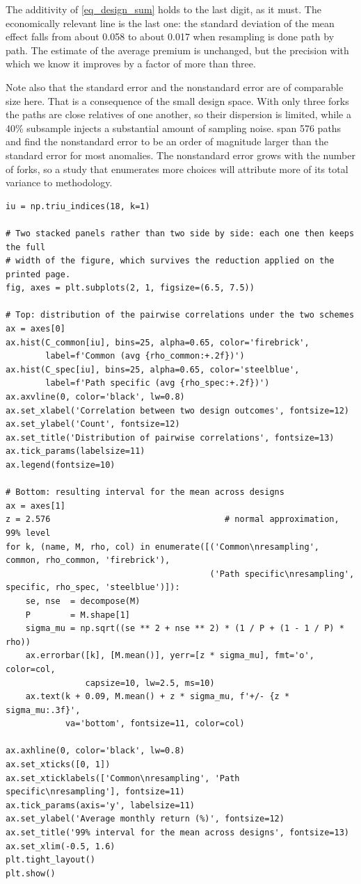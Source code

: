 The additivity of \ref{eq_design_sum} holds to the last digit, as it must. The economically relevant line is the last one: the standard deviation of the mean effect falls from about 0.058 to about 0.017 when resampling is done path by path. The estimate of the average premium is unchanged, but the precision with which we know it improves by a factor of more than three.

Note also that the standard error and the nonstandard error are of comparable size here. That is a consequence of the small design space. With only three forks the paths are close relatives of one another, so their dispersion is limited, while a 40\% subsample injects a substantial amount of sampling noise. \cite{coqueret2026persistent} span 576 paths and find the nonstandard error to be an order of magnitude larger than the standard error for most anomalies. The nonstandard error grows with the number of forks, so a study that enumerates more choices will attribute more of its total variance to methodology.

\begin{verbatim}
iu = np.triu_indices(18, k=1)

# Two stacked panels rather than two side by side: each one then keeps the full
# width of the figure, which survives the reduction applied on the printed page.
fig, axes = plt.subplots(2, 1, figsize=(6.5, 7.5))

# Top: distribution of the pairwise correlations under the two schemes
ax = axes[0]
ax.hist(C_common[iu], bins=25, alpha=0.65, color='firebrick',
        label=f'Common (avg {rho_common:+.2f})')
ax.hist(C_spec[iu], bins=25, alpha=0.65, color='steelblue',
        label=f'Path specific (avg {rho_spec:+.2f})')
ax.axvline(0, color='black', lw=0.8)
ax.set_xlabel('Correlation between two design outcomes', fontsize=12)
ax.set_ylabel('Count', fontsize=12)
ax.set_title('Distribution of pairwise correlations', fontsize=13)
ax.tick_params(labelsize=11)
ax.legend(fontsize=10)

# Bottom: resulting interval for the mean across designs
ax = axes[1]
z = 2.576                                   # normal approximation, 99% level
for k, (name, M, rho, col) in enumerate([('Common\nresampling', common, rho_common, 'firebrick'),
                                         ('Path specific\nresampling', specific, rho_spec, 'steelblue')]):
    se, nse  = decompose(M)
    P        = M.shape[1]
    sigma_mu = np.sqrt((se ** 2 + nse ** 2) * (1 / P + (1 - 1 / P) * rho))
    ax.errorbar([k], [M.mean()], yerr=[z * sigma_mu], fmt='o', color=col,
                capsize=10, lw=2.5, ms=10)
    ax.text(k + 0.09, M.mean() + z * sigma_mu, f'+/- {z * sigma_mu:.3f}',
            va='bottom', fontsize=11, color=col)

ax.axhline(0, color='black', lw=0.8)
ax.set_xticks([0, 1])
ax.set_xticklabels(['Common\nresampling', 'Path specific\nresampling'], fontsize=11)
ax.tick_params(axis='y', labelsize=11)
ax.set_ylabel('Average monthly return (%)', fontsize=12)
ax.set_title('99% interval for the mean across designs', fontsize=13)
ax.set_xlim(-0.5, 1.6)
plt.tight_layout()
plt.show()
\end{verbatim}

